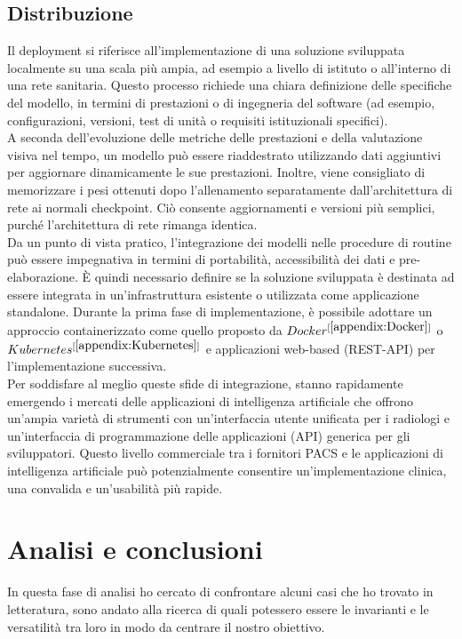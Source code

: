 \documentclass[12pt,a4paper]{report}
\begin{document}
\subsection{Distribuzione}
Il deployment si riferisce all'implementazione di una soluzione sviluppata localmente su una scala più ampia, ad esempio a livello di istituto o all'interno di una rete sanitaria. Questo processo richiede una chiara definizione delle specifiche del modello, in termini di prestazioni o di ingegneria del software (ad esempio, configurazioni, versioni, test di unità o requisiti istituzionali specifici).\\
A seconda dell'evoluzione delle metriche delle prestazioni e della valutazione visiva nel tempo, un modello può essere riaddestrato utilizzando dati aggiuntivi per aggiornare dinamicamente le sue prestazioni.
Inoltre, viene consigliato di memorizzare i pesi ottenuti dopo l'allenamento separatamente dall'architettura di rete ai normali checkpoint. Ciò consente aggiornamenti e versioni più semplici, purché l'architettura di rete rimanga identica.\\
Da un punto di vista pratico, l'integrazione dei modelli nelle procedure di routine può essere impegnativa in termini di portabilità, accessibilità dei dati e pre-elaborazione. È quindi necessario definire se la soluzione sviluppata è destinata ad essere integrata in un'infrastruttura esistente o utilizzata come applicazione standalone. Durante la prima fase di implementazione, è possibile adottare un approccio containerizzato come quello proposto da $Docker^{[\ref{appendix:Docker}]}$ o $Kubernetes^{[\ref{appendix:Kubernetes}]}$ e applicazioni web-based (REST-API) per l'implementazione successiva.\\
Per soddisfare al meglio queste sfide di integrazione, stanno rapidamente emergendo i mercati delle applicazioni di intelligenza artificiale che offrono un'ampia varietà di strumenti con un'interfaccia utente unificata per i radiologi e un'interfaccia di programmazione delle applicazioni (API) generica per gli sviluppatori. Questo livello commerciale tra i fornitori PACS e le applicazioni di intelligenza artificiale può potenzialmente consentire un'implementazione clinica, una convalida e un'usabilità più rapide.\cite{montagnon2020deep}

\section{Analisi e conclusioni}
In questa fase di analisi ho cercato di confrontare alcuni casi che ho trovato in letteratura, sono andato alla ricerca di quali potessero essere le invarianti e le versatilità tra loro in modo da centrare il nostro obiettivo.\\
\end{document}
